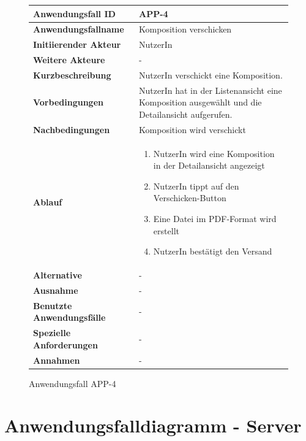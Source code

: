\begin{figure}[h]
	\centering
	\begin{tabularx}{\textwidth}{ X | X }
		\textbf{Anwendungsfall ID} & APP-4 \\ \hline
		\textbf{Anwendungsfallname} & Komposition verschicken \\ \hline
		\textbf{Initiierender Akteur} & NutzerIn \\ \hline
		\textbf{Weitere Akteure} & -  \\ \hline
		\textbf{Kurzbeschreibung} & NutzerIn verschickt eine Komposition.  \\ \hline
		\textbf{Vorbedingungen} & NutzerIn hat in der Listenansicht eine Komposition ausgewählt und die Detailansicht aufgerufen.  \\ \hline
		\textbf{Nachbedingungen} & Komposition wird verschickt  \\ \hline
		\textbf{Ablauf} &
		\begin{enumerate}
			\item NutzerIn wird eine Komposition in der Detailansicht angezeigt
			\item NutzerIn tippt auf den Verschicken-Button
			\item Eine Datei im PDF-Format wird erstellt
			\item NutzerIn bestätigt den Versand
		\end{enumerate} \\ \hline
		\textbf{Alternative} &
		-  \\ \hline
		\textbf{Ausnahme} &
		- \\ \hline
		\textbf{Benutzte Anwendungsfälle} & - \\ \hline
		\textbf{Spezielle Anforderungen} & - \\ \hline
		\textbf{Annahmen} & -
	\end{tabularx}
	\caption{Anwendungsfall APP-4}
	\label{fig:anwendungsfall-app-tabelle-APP-4}
\end{figure}

\newpage


\section{Anwendungsfalldiagramm - Server}

